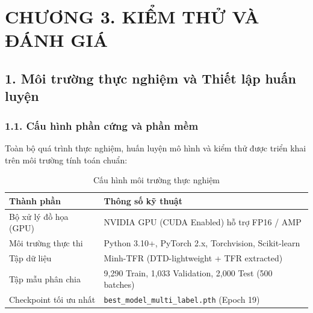 \section{CHƯƠNG 3. KIỂM THỬ VÀ ĐÁNH GIÁ}
\vspace{0.5cm}
\setlength{\fboxrule}{1pt} 
\setlength{\fboxsep}{0pt}  

\subsection{1. Môi trường thực nghiệm và Thiết lập huấn luyện}

\subsubsection{1.1. Cấu hình phần cứng và phần mềm}
\indent\indent Toàn bộ quá trình thực nghiệm, huấn luyện mô hình và kiểm thử được triển khai trên môi trường tính toán chuẩn:
\begin{table}[H]
    \centering
    \caption{Cấu hình môi trường thực nghiệm}
    \label{tab:env_specs}
    \vspace{0.2cm}
    \renewcommand{\arraystretch}{1.3}
    \begin{tabular}{|m{4.5cm}|m{9.5cm}|}
        \hline
        \textbf{Thành phần} & \textbf{Thông số kỹ thuật} \\
        \hline
        Bộ xử lý đồ họa (GPU) & NVIDIA GPU (CUDA Enabled) hỗ trợ FP16 / AMP \\
        \hline
        Môi trường thực thi & Python 3.10+, PyTorch 2.x, Torchvision, Scikit-learn \\
        \hline
        Tập dữ liệu & Minh-TFR (DTD-lightweight + TFR extracted) \\
        \hline
        Tập mẫu phân chia & 9,290 Train, 1,033 Validation, 2,000 Test (500 batches) \\
        \hline
        Checkpoint tối ưu nhất & \texttt{best\_model\_multi\_label.pth} (Epoch 19) \\
        \hline
    \end{tabular}
\end{table}

